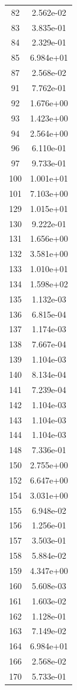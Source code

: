 \documentclass[12pt]{article}
\begin{document}
\begin{longtable}{@{}cc@{}}
82 & 2.562e-02 \\
83 & 3.835e-01 \\
84 & 2.329e-01 \\
85 & 6.984e+01 \\
87 & 2.568e-02 \\
91 & 7.762e-01 \\
92 & 1.676e+00 \\
93 & 1.423e+00 \\
94 & 2.564e+00 \\
96 & 6.110e-01 \\
97 & 9.733e-01 \\
100 & 1.001e+01 \\
101 & 7.103e+00 \\
129 & 1.015e+01 \\
130 & 9.222e-01 \\
131 & 1.656e+00 \\
132 & 3.581e+00 \\
133 & 1.010e+01 \\
134 & 1.598e+02 \\
135 & 1.132e-03 \\
136 & 6.815e-04 \\
137 & 1.174e-03 \\
138 & 7.667e-04 \\
139 & 1.104e-03 \\
140 & 8.134e-04 \\
141 & 7.239e-04 \\
142 & 1.104e-03 \\
143 & 1.104e-03 \\
144 & 1.104e-03 \\
148 & 7.336e-01 \\
150 & 2.755e+00 \\
152 & 6.647e+00 \\
154 & 3.031e+00 \\
155 & 6.948e-02 \\
156 & 1.256e-01 \\
157 & 3.503e-01 \\
158 & 5.884e-02 \\
159 & 4.347e+00 \\
160 & 5.608e-03 \\
161 & 1.603e-02 \\
162 & 1.128e-01 \\
163 & 7.149e-02 \\
164 & 6.984e+01 \\
166 & 2.568e-02 \\
170 & 5.733e-01 \\

\end{longtable}
\end{document}
